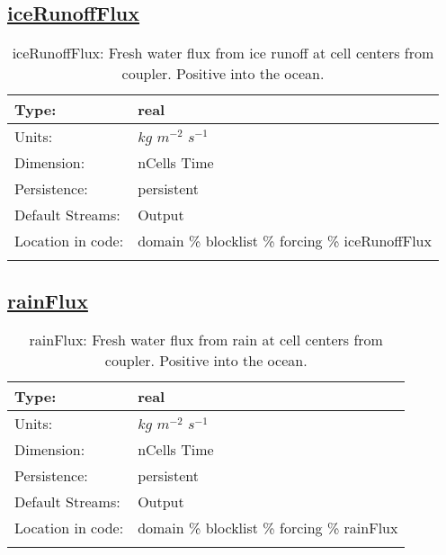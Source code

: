 \subsection[iceRunoffFlux]{\hyperref[sec:var_tab_forcing]{iceRunoffFlux}}
\label{subsec:var_sec_forcing_iceRunoffFlux}
\begin{center}
\begin{longtable}{| p{2.0in} | p{4.0in} |}
        \hline 
        Type: & real \\
        \hline 
        Units: & $kg$ $m^{-2}$ $s^{-1}$ \\
        \hline 
        Dimension: & nCells Time \\
        \hline 
        Persistence: & persistent \\
        \hline 
		 Default Streams: & Output  \\
        \hline 
		 Location in code: & domain \% blocklist \% forcing \% iceRunoffFlux \\
		 \hline 
    \caption{iceRunoffFlux: Fresh water flux from ice runoff at cell centers from coupler. Positive into the ocean.}
\end{longtable}
\end{center}
\subsection[rainFlux]{\hyperref[sec:var_tab_forcing]{rainFlux}}
\label{subsec:var_sec_forcing_rainFlux}
\begin{center}
\begin{longtable}{| p{2.0in} | p{4.0in} |}
        \hline 
        Type: & real \\
        \hline 
        Units: & $kg$ $m^{-2}$ $s^{-1}$ \\
        \hline 
        Dimension: & nCells Time \\
        \hline 
        Persistence: & persistent \\
        \hline 
		 Default Streams: & Output  \\
        \hline 
		 Location in code: & domain \% blocklist \% forcing \% rainFlux \\
		 \hline 
    \caption{rainFlux: Fresh water flux from rain at cell centers from coupler. Positive into the ocean.}
\end{longtable}
\end{center}
